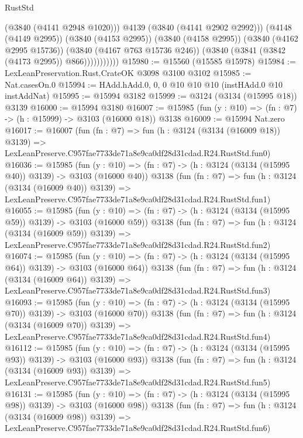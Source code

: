 \begin{lexlean}{RustStd}
\begin{coremodule}
                          (@3840 (@4141 @2948 @1020)))
                        @4139
                        (@3840 (@4141 @2902 @2992)))
                      (@4148 (@4149 @2995))
                      (@3840 (@4153 @2995))
                      (@3840 (@4158 @2995))
                      (@3840 (@4162 @2995 @15736))
                      (@3840 (@4167 @763 @15736 @246))
                      (@3840 (@3841 (@3842 (@4173 @2995)) @866)))))))))))
@15980 := @15560 (@15585 @15978)
@15984 := LexLeanPreservation.Rust.CrateOK @3098 @3100 @3102
@15985 := Nat.casesOn.{0}
@15994 := HAdd.hAdd.{0, 0, 0} @10 @10 @10 (instHAdd.{0} @10 instAddNat)
@15995 := @15994 @3182
@15999 := @3124 (@3134 (@15995 @18)) @3139
@16000 := @15994 @3180
@16007 := @15985 (fun (y : @10) => (fn : @7) -> (h : @15999) -> @3103 (@16000 @18)) @3138
@16009 := @15994 Nat.zero
@16017 := @16007
    (fun (fn : @7) =>
    fun (h : @3124 (@3134 (@16009 @18)) @3139) =>
    LexLeanPreserve.C957fae7733de71a8e9ca0df28d31cdad.R24.RustStd.fun0)
@16036 := @15985
    (fun (y : @10) => (fn : @7) -> (h : @3124 (@3134 (@15995 @40)) @3139) -> @3103 (@16000 @40))
    @3138
    (fun (fn : @7) =>
    fun (h : @3124 (@3134 (@16009 @40)) @3139) =>
    LexLeanPreserve.C957fae7733de71a8e9ca0df28d31cdad.R24.RustStd.fun1)
@16055 := @15985
    (fun (y : @10) => (fn : @7) -> (h : @3124 (@3134 (@15995 @59)) @3139) -> @3103 (@16000 @59))
    @3138
    (fun (fn : @7) =>
    fun (h : @3124 (@3134 (@16009 @59)) @3139) =>
    LexLeanPreserve.C957fae7733de71a8e9ca0df28d31cdad.R24.RustStd.fun2)
@16074 := @15985
    (fun (y : @10) => (fn : @7) -> (h : @3124 (@3134 (@15995 @64)) @3139) -> @3103 (@16000 @64))
    @3138
    (fun (fn : @7) =>
    fun (h : @3124 (@3134 (@16009 @64)) @3139) =>
    LexLeanPreserve.C957fae7733de71a8e9ca0df28d31cdad.R24.RustStd.fun3)
@16093 := @15985
    (fun (y : @10) => (fn : @7) -> (h : @3124 (@3134 (@15995 @70)) @3139) -> @3103 (@16000 @70))
    @3138
    (fun (fn : @7) =>
    fun (h : @3124 (@3134 (@16009 @70)) @3139) =>
    LexLeanPreserve.C957fae7733de71a8e9ca0df28d31cdad.R24.RustStd.fun4)
@16112 := @15985
    (fun (y : @10) => (fn : @7) -> (h : @3124 (@3134 (@15995 @93)) @3139) -> @3103 (@16000 @93))
    @3138
    (fun (fn : @7) =>
    fun (h : @3124 (@3134 (@16009 @93)) @3139) =>
    LexLeanPreserve.C957fae7733de71a8e9ca0df28d31cdad.R24.RustStd.fun5)
@16131 := @15985
    (fun (y : @10) => (fn : @7) -> (h : @3124 (@3134 (@15995 @98)) @3139) -> @3103 (@16000 @98))
    @3138
    (fun (fn : @7) =>
    fun (h : @3124 (@3134 (@16009 @98)) @3139) =>
    LexLeanPreserve.C957fae7733de71a8e9ca0df28d31cdad.R24.RustStd.fun6)

\end{coremodule}
\end{lexlean}
